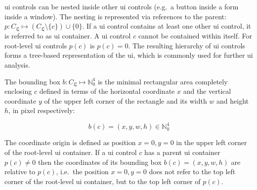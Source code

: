 \gls{ui} controls can be nested inside other \gls{ui} controls (e.g.~a button inside a form inside a window).
The nesting is represented via references to the parent: \(p: C_{\mathfrak{L}} \mapsto (C_{\mathfrak{L}} \setminus \{c\}) \cup \{0\}\).
If a \gls{ui} control contains at least one other \gls{ui} control, it is referred to as \gls{ui} container.
A \gls{ui} control \(c\) cannot be contained within itself. %
For root-level \gls{ui} controls \(p(c)\) is \(p(c) = 0\).
The resulting hierarchy of \gls{ui} controls forms a tree-based representation of the \gls{ui}, which is commonly used for further \gls{ui} analysis.

The bounding box \(b: C_{\mathfrak{L}} \mapsto \mathbb{N}_0^4\) is the minimal rectangular area completely enclosing \(c\) defined in terms of the horizontal coordinate \(x\) and the vertical coordinate \(y\) of the upper left corner of the rectangle and its width \(w\) and height \(h\), in pixel respectively:

\begin{equation}b(c) = (x,y,w,h) \in \mathbb{N}_0^4\label{eq:bounding-box}\end{equation}

The coordinate origin is defined as position \(x=0, y=0\) in the upper left corner of the root-level \gls{ui} container.
If a \gls{ui} control \(c\) has a parent \gls{ui} container \(p(c) \neq 0\) then the coordinates of its bounding box \(b(c) = (x,y,w,h)\) are relative to \(p(c)\), i.e.~the position \(x=0, y=0\) does not refer to the top left corner of the root-level \gls{ui} container, but to the top left corner of \(p(c)\).



%



